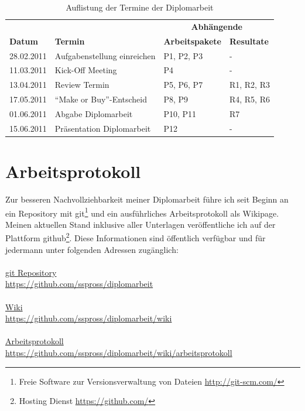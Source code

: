 \begin{table}[h]
\begin{center}
    \begin{tabular}{llll}
        \toprule & & \multicolumn{2}{c}{\textbf{Abhängende}} \\
        \textbf{Datum} & \textbf{Termin} & \textbf{Arbeitspakete} & \textbf{Resultate} \\
        \midrule 28.02.2011 & Aufgabenstellung einreichen & P1, P2, P3 & - \\
        \midrule 11.03.2011 & Kick-Off Meeting & P4 & -\\
        \midrule 13.04.2011 & Review Termin & P5, P6, P7 & R1, R2, R3 \\
        \midrule 17.05.2011 & ``Make or Buy''-Entscheid & P8, P9 & R4, R5, R6 \\
        \midrule 01.06.2011 & Abgabe Diplomarbeit & P10, P11 & R7 \\
        \midrule 15.06.2011 & Präsentation Diplomarbeit & P12 & - \\
        \bottomrule
    \end{tabular}
    \caption{Auflistung der Termine der Diplomarbeit}
    \label{tab:termine_diplomarbeit}
\end{center}
\end{table}

\section{Arbeitsprotokoll}
Zur besseren Nachvollziehbarkeit meiner Diplomarbeit führe ich seit Beginn an
ein Repository mit git\footnote{Freie Software zur Versionsverwaltung von Dateien 
\url{http://git-scm.com/}} und ein ausführliches Arbeitsprotokoll als Wikipage.
Meinen aktuellen Stand inklusive aller Unterlagen veröffentliche ich auf der 
Plattform github\footnote{Hosting Dienst \url{https://github.com/}}. Diese 
Informationen sind öffentlich verfügbar und für jedermann unter folgenden 
Adressen zugänglich:
\\\\
\underline{git Repository}
\\
\url{https://github.com/sspross/diplomarbeit}
\\\\
\underline{Wiki}
\\
\url{https://github.com/sspross/diplomarbeit/wiki}
\\\\
\underline{Arbeitsprotokoll}
\\
\url{https://github.com/sspross/diplomarbeit/wiki/arbeitsprotokoll}

